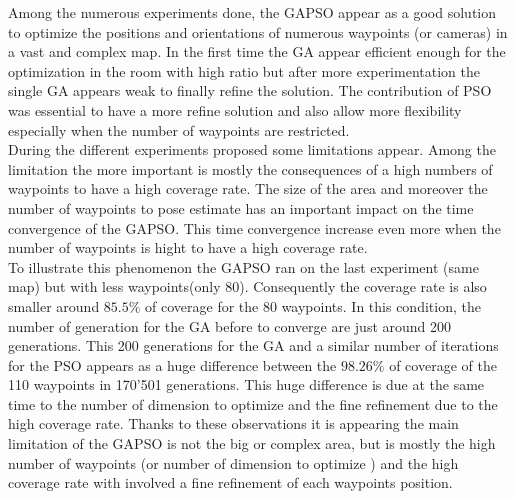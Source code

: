 Among the numerous experiments done, the GAPSO appear as a good solution to optimize the positions and orientations of numerous waypoints (or cameras) in a vast and complex map.
In the first time the GA appear efficient enough for the optimization in the room with high ratio but after more experimentation the single GA appears weak to finally refine the solution. The contribution of PSO was essential to have a more refine solution and also allow more flexibility especially when the number of waypoints are restricted. \\
During the different experiments proposed some limitations appear. Among the limitation the more important is mostly the consequences of a high numbers of waypoints to have a high coverage rate.
 The size of the area and moreover the number of waypoints to pose estimate has an important impact on the time convergence of the GAPSO.  This time convergence increase even more when the number of waypoints is hight to have a high coverage rate. \\
 To illustrate this phenomenon the GAPSO ran on the last experiment (same map) but  with less waypoints(only 80). Consequently the coverage rate is also smaller around $85.5\%$ of coverage for  the 80 waypoints. In this condition, the number of generation for the GA before to converge are just around 200 generations.  This 200 generations for the GA and a similar number of iterations for the PSO appears as a huge difference between the $98.26\%$ of coverage of the 110 waypoints in 170'501 generations. This huge difference is due at the same time to the number of dimension to optimize and the fine refinement due to the high coverage rate.
 Thanks to these observations it is appearing the main limitation of the GAPSO is not the  big or complex area, but is mostly the high number of waypoints (or number of dimension to optimize ) and the high coverage rate with involved a fine refinement of each waypoints position. 
 





